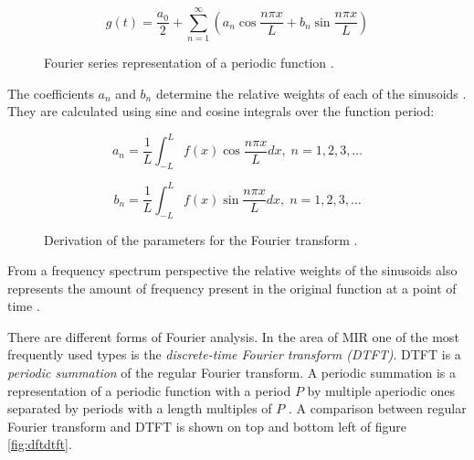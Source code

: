 \begin{figure}[H]
    \label{fig:fourierseriesequation}
    \begin{equation}
        g(t) = \frac{a_0}{2} + \sum_{n=1}^{\infty}({a_n}\cos\frac{n{\pi}x}{L} + {b_n}\sin\frac{n{\pi}x}{L})
    \end{equation}
    \caption[Fourier transformation equation for periodic functions]{Fourier series representation of a periodic function \cite{fourierequations}.}
\end{figure}

The coefficients $a_n$ and $b_n$ determine the relative weights of each of the
sinusoids \cite{fourierseries}. They are calculated using sine and cosine
integrals over the function period:

\begin{figure}[H]
    \begin{equation}
        a_n = \frac{1}{L}\int_{-L}^{L}f(x)\cos\frac{n{\pi}x}{L}dx,\; n = 1,2,3,\dots
    \end{equation}

    \begin{equation}
        b_n = \frac{1}{L}\int_{-L}^{L}f(x)\sin\frac{n{\pi}x}{L}dx,\; n = 1,2,3,\dots
    \end{equation}
    \caption[Fourier series parameter derivation]{Derivation of the parameters for the Fourier transform \cite{fourierequations}.}
\end{figure}



From a frequency spectrum perspective the relative weights of the sinusoids also
represents the amount of frequency present in the original function at a point
of time \cite{wiki:fourier}. 

There are different forms of Fourier analysis. In the area of MIR one of the
most frequently used types is the \textit{discrete-time Fourier transform
(DTFT)}. DTFT is a \textit{periodic summation} of the regular Fourier transform.
A periodic summation is a representation of a periodic function with a period
$P$ by multiple aperiodic ones separated by periods with a length multiples of
$P$ \cite{wiki:periodicsummation}. A comparison between regular Fourier
transform and DTFT is shown on top and bottom left of figure \ref{fig:dftdtft}.

